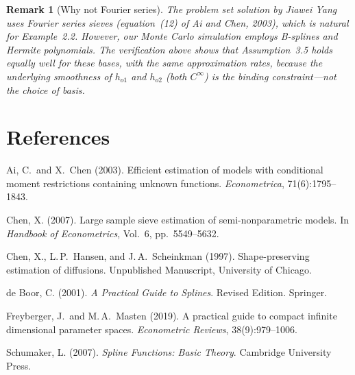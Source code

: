 \documentclass[12pt]{article}
\newtheorem{remark}{Remark}
\begin{document}
\begin{remark}[Why not Fourier series]
The problem set solution by Jiawei Yang uses Fourier series sieves (equation~(12) of Ai and Chen, 2003), which is natural for Example~2.2. However, our Monte Carlo simulation employs B-splines and Hermite polynomials. The verification above shows that Assumption~3.5 holds equally well for these bases, with the same approximation rates, because the underlying smoothness of $h_{o1}$ and $h_{o2}$ (both $C^\infty$) is the binding constraint---not the choice of basis.
\end{remark}

\bigskip
\section*{References}

\begin{description}
\item Ai, C.\ and X.\ Chen (2003). Efficient estimation of models with conditional moment restrictions containing unknown functions. \textit{Econometrica}, 71(6):1795--1843.

\item Chen, X. (2007). Large sample sieve estimation of semi-nonparametric models. In \textit{Handbook of Econometrics}, Vol.~6, pp.~5549--5632.

\item Chen, X., L.\,P.\ Hansen, and J.\,A.\ Scheinkman (1997). Shape-preserving estimation of diffusions. Unpublished Manuscript, University of Chicago.

\item de Boor, C. (2001). \textit{A Practical Guide to Splines}. Revised Edition. Springer.

\item Freyberger, J.\ and M.\,A.\ Masten (2019). A practical guide to compact infinite dimensional parameter spaces. \textit{Econometric Reviews}, 38(9):979--1006.

\item Schumaker, L. (2007). \textit{Spline Functions: Basic Theory}. Cambridge University Press.
\end{description}
\end{document}
